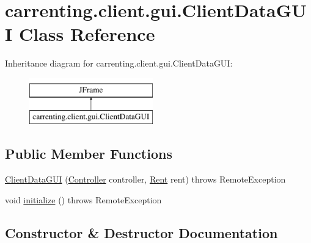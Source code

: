 \hypertarget{classcarrenting_1_1client_1_1gui_1_1_client_data_g_u_i}{}\section{carrenting.\+client.\+gui.\+Client\+Data\+G\+UI Class Reference}
\label{classcarrenting_1_1client_1_1gui_1_1_client_data_g_u_i}
Inheritance diagram for carrenting.\+client.\+gui.\+Client\+Data\+G\+UI\+:\begin{figure}[H]
\begin{center}
\leavevmode
\includegraphics[height=2.000000cm]{classcarrenting_1_1client_1_1gui_1_1_client_data_g_u_i}
\end{center}
\end{figure}
\subsection*{Public Member Functions}
\begin{DoxyCompactItemize}
\item 
\mbox{\hyperlink{classcarrenting_1_1client_1_1gui_1_1_client_data_g_u_i_aa54260730a99a185f2f2b0ef9066f494}{Client\+Data\+G\+UI}} (\mbox{\hyperlink{classcarrenting_1_1client_1_1_controller}{Controller}} controller, \mbox{\hyperlink{classcarrenting_1_1server_1_1jdo_1_1_rent}{Rent}} rent)  throws Remote\+Exception
\item 
void \mbox{\hyperlink{classcarrenting_1_1client_1_1gui_1_1_client_data_g_u_i_a2eb7f748bf70c5f4e42c71106a604a40}{initialize}} ()  throws Remote\+Exception 
\end{DoxyCompactItemize}


\subsection{Constructor \& Destructor Documentation}
\mbox{\label{classcarrenting_1_1client_1_1gui_1_1_client_data_g_u_i_aa54260730a99a185f2f2b0ef9066f494}} 
